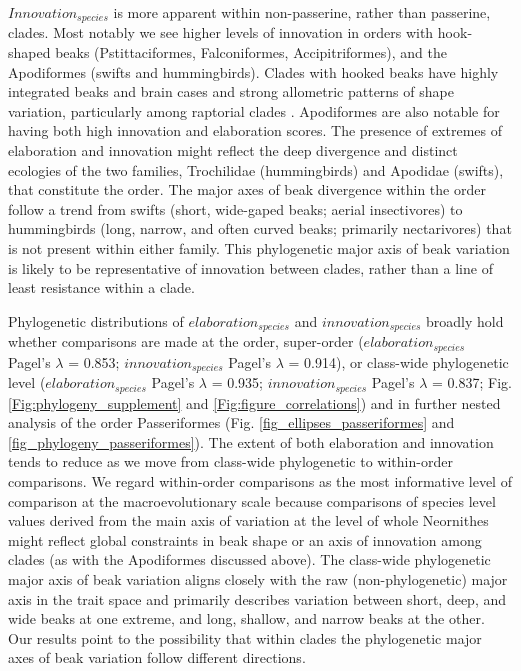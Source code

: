 \documentclass[12pt,letterpaper]{article}
\begin{document}
$Innovation_{species}$ is more apparent within non-passerine, rather than passerine, clades.
Most notably we see higher levels of innovation in orders with hook-shaped beaks (Pstittaciformes, Falconiformes, Accipitriformes), and the Apodiformes (swifts and hummingbirds).
Clades with hooked beaks have highly integrated beaks and brain cases and strong allometric patterns of shape variation, particularly among raptorial clades \cite{bright2016shapes, bright2019multifactorial}.
Apodiformes are also notable for having both high innovation and elaboration scores.
The presence of extremes of elaboration and innovation might reflect the deep divergence and distinct ecologies of the two families, Trochilidae (hummingbirds) and Apodidae (swifts), that constitute the order.
The major axes of beak divergence within the order follow a trend from swifts (short, wide-gaped beaks; aerial insectivores) to hummingbirds (long, narrow, and often curved beaks; primarily nectarivores) that is not present within either family.
This phylogenetic major axis of beak variation is likely to be representative of innovation between clades, rather than a line of least resistance within a clade.

Phylogenetic distributions of $elaboration_{species}$ and $innovation_{species}$ broadly hold whether comparisons are made at the order, super-order ($elaboration_{species}$ Pagel's $\lambda$ = 0.853; $innovation_{species}$ Pagel's $\lambda$ = 0.914), or class-wide phylogenetic level ($elaboration_{species}$ Pagel's $\lambda$ = 0.935; $innovation_{species}$ Pagel’s $\lambda$ = 0.837; Fig. \ref{Fig:phylogeny_supplement} and \ref{Fig:figure_correlations}) %
and in further nested analysis of the order Passeriformes (Fig. \ref{fig_ellipses_passeriformes} and \ref{fig_phylogeny_passeriformes}).
The extent of both elaboration and innovation tends to reduce as we move from class-wide phylogenetic to within-order comparisons.
We regard within-order comparisons as the most informative level of comparison at the macroevolutionary scale
because comparisons of species level values derived from the main axis of variation at the level of whole Neornithes might reflect global constraints in beak shape or an axis of innovation among clades (as with the Apodiformes discussed above).
The class-wide phylogenetic major axis of beak variation aligns closely with the raw (non-phylogenetic) major axis in the trait space and primarily describes variation between short, deep, and wide beaks at one extreme, and long, shallow, and narrow beaks at the other.
Our results point to the possibility that within clades the phylogenetic major axes of beak variation follow different directions.
\end{document}
